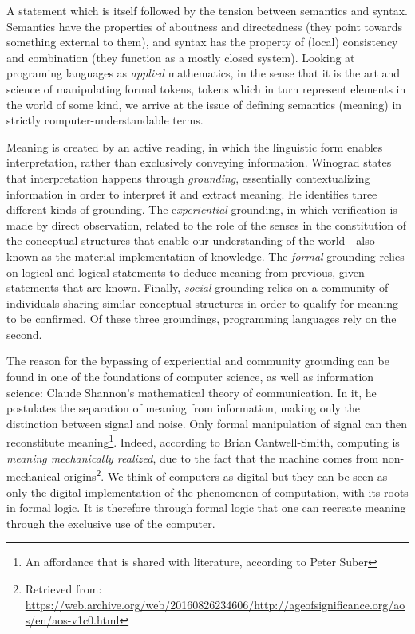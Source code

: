 \documentclass{article}
\begin{document}
A statement which is itself followed by the tension between semantics and syntax. Semantics have the properties of aboutness and directedness (they point towards something external to them), and syntax has the property of (local) consistency and combination (they function as a mostly closed system). Looking at programing languages as \emph{applied} mathematics, in the sense that it is the art and science of manipulating formal tokens, tokens which in turn represent elements in the world of some kind, we arrive at the issue of defining semantics (meaning) in strictly computer-understandable terms.

Meaning is created by an active reading, in which the linguistic form enables interpretation, rather than exclusively conveying information. Winograd states that interpretation happens through \emph{grounding}, essentially contextualizing information in order to interpret it and extract meaning. He identifies three different kinds of grounding. The e\emph{xperiential} grounding, in which verification is made by direct observation, related to the role of the senses in the constitution of the conceptual structures that enable our understanding of the world—also known as the material implementation of knowledge. The \emph{formal} grounding relies on logical and logical statements to deduce meaning from previous, given statements that are known. Finally, \emph{social} grounding relies on a community of individuals sharing similar conceptual structures in order to qualify for meaning to be confirmed. Of these three groundings, programming languages rely on the second.

The reason for the bypassing of experiential and community grounding can be found in one of the foundations of computer science, as well as information science: Claude Shannon's mathematical theory of communication. In it, he postulates the separation of meaning from information, making only the distinction between signal and noise. Only formal manipulation of signal can then reconstitute meaning\footnote{An affordance that is shared with literature, according to Peter Suber\cite{suber_what_1988}}. Indeed, according to Brian Cantwell-Smith, computing is \emph{meaning mechanically realized}, due to the fact that the machine comes from non-mechanical origins\footnote{Retrieved from: \url{https://web.archive.org/web/20160826234606/http://ageofsignificance.org/aos/en/aos-v1c0.html}}. We think of computers as digital but they can be seen as only the digital implementation of the phenomenon of computation, with its roots in formal logic. It is therefore through formal logic that one can recreate meaning through the exclusive use of the computer.
\end{document}
